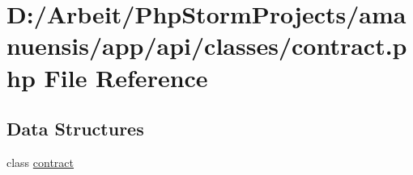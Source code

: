 \hypertarget{a00057}{}\section{D\+:/\+Arbeit/\+Php\+Storm\+Projects/amanuensis/app/api/classes/contract.php File Reference}
\label{a00057}
\subsection*{Data Structures}
\begin{DoxyCompactItemize}
\item 
class \hyperlink{a00019}{contract}
\end{DoxyCompactItemize}
